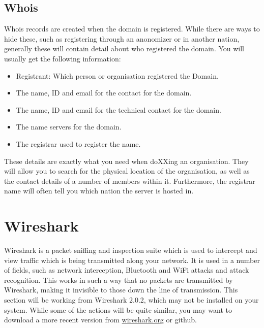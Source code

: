		\subsection{Whois}
			Whois records are created when the domain is registered.
			While there are ways to hide these, such as registering through an anonomizer or in another nation, generally these will contain detail about who registered the domain.
			You will usually get the following information:
			\begin{itemize}
				\item Registrant: Which person or organisation registered the Domain.
				\item The name, ID and email for the contact for the domain.
				\item The name, ID and email for the technical contact for the domain.
				\item The name servers for the domain.
				\item The registrar used to register the name.
			\end{itemize}
			These details are exactly what you need when doXXing an organisation.
			They will allow you to search for the physical location of the organisation, as well as the contact details of a number of members within it.
			Furthermore, the registrar name will often tell you which nation the server is hosted in.
	\section{Wireshark}
		Wireshark is a packet sniffing and inspection suite which is used to intercept and view traffic which is being transmitted along your network.\cite{WSUG}
		It is used in a number of fields, such as network interception, Bluetooth and WiFi attacks and attack recognition.
		This works in such a way that no packets are transmitted by Wireshark, making it invisible to those down the line of transmission.
		This section will be working from Wireshark 2.0.2, which may not be installed on your system.
		While some of the actions will be quite similar, you may want to download a more recent version from \url{wireshark.org} or github.

